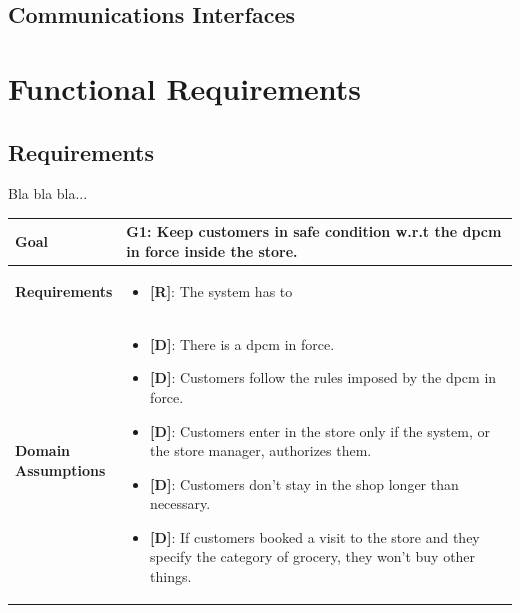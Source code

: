 \subsection{Communications Interfaces}

\section{Functional Requirements}

\subsection{Requirements}

Bla bla bla...

\begin{table}[H]
\centering
\begin{tabular}{| m{} | m{} |} 
	\hline
	\textbf{Goal} &
		\textbf{G1: Keep customers in safe condition w.r.t the \gls{dpcm} in force inside the store.} \\
	\hline
	\textbf{Requirements} &
		\begin{itemize}
			\item {\textbf{[R]}}: The system has to
		\end{itemize} \\ 
	\hline
	\shortstack[l]{\textbf{Domain} \\ \textbf{Assumptions}} & 
		\begin{itemize}
			\item {\textbf{[D]}}: There is a \gls{dpcm} in force.
			\item {\textbf{[D]}}: Customers follow the rules imposed by the \gls{dpcm} in force.
			\item {\textbf{[D]}}: Customers enter in the store only if the system, or the store manager, authorizes them.
			\item {\textbf{[D]}}: Customers don't stay in the shop longer than necessary.
			\item {\textbf{[D]}}: If customers booked a visit to the store and they specify the category of grocery, they won't buy other things.
		\end{itemize} \\ 
	\hline
\end{tabular}
\end{table}

